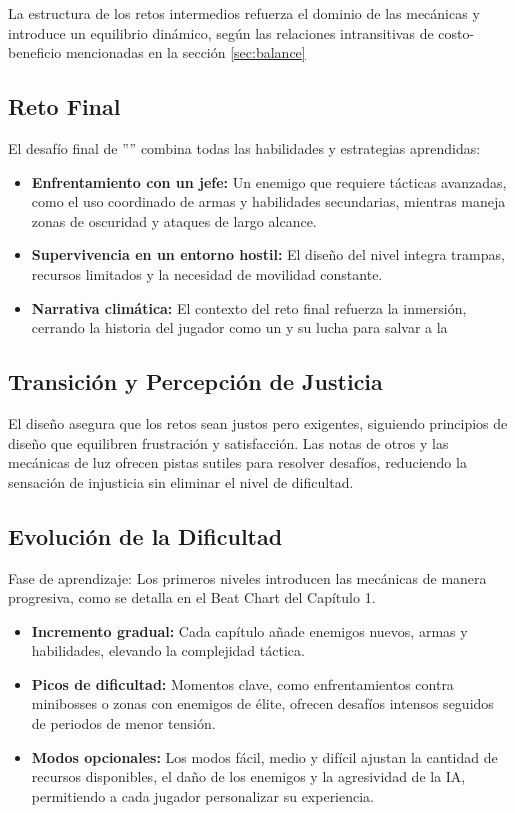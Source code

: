         La estructura de los retos intermedios refuerza el dominio de las mecánicas y introduce un equilibrio dinámico, según las relaciones intransitivas de costo-beneficio mencionadas en la sección \ref{sec:balance}
    \subsection{Reto Final}
        El desafío final de ''\gameTitle'' combina todas las habilidades y estrategias aprendidas:

        \begin{itemize}
            \item \textbf{Enfrentamiento con un jefe:} Un enemigo que requiere tácticas avanzadas, como el uso coordinado de armas y habilidades secundarias, mientras maneja zonas de oscuridad y ataques de largo alcance.

            \item \textbf{Supervivencia en un entorno hostil:} El diseño del nivel integra trampas, recursos limitados y la necesidad de movilidad constante.

            \item \textbf{Narrativa climática:} El contexto del reto final refuerza la inmersión, cerrando la historia del jugador como un \hunter y su lucha para salvar a la \humanity
        \end{itemize}
    \subsection{Transición y Percepción de Justicia}

        El diseño asegura que los retos sean justos pero exigentes, siguiendo principios de diseño que equilibren frustración y satisfacción. Las notas de otros \hunters y las mecánicas de luz ofrecen pistas sutiles para resolver desafíos, reduciendo la sensación de injusticia sin eliminar el nivel de dificultad.

    \subsection{Evolución de la Dificultad}

        Fase de aprendizaje: Los primeros niveles introducen las mecánicas de manera progresiva, como se detalla en el Beat Chart del Capítulo 1.

        \begin{itemize}
            \item \textbf{Incremento gradual:} Cada capítulo añade enemigos nuevos, armas y habilidades, elevando la complejidad táctica.
            \item \textbf{Picos de dificultad:} Momentos clave, como enfrentamientos contra minibosses o zonas con enemigos de élite, ofrecen desafíos intensos seguidos de periodos de menor tensión.
            \item \textbf{Modos opcionales:} Los modos fácil, medio y difícil ajustan la cantidad de recursos disponibles, el daño de los enemigos y la agresividad de la IA, permitiendo a cada jugador personalizar su experiencia.
        \end{itemize}

